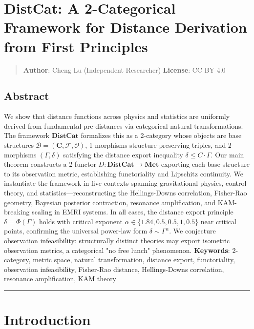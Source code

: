 \documentclass[
]{article}
\author{}
\date{}
\begin{document}
\section{DistCat: A 2-Categorical Framework for Distance Derivation from
First
Principles}\label{distcat-a-2-categorical-framework-for-distance-derivation-from-first-principles}

\begin{quote}
\textbf{Author}: Cheng Lu (Independent Researcher)
\textbf{License}: CC BY 4.0
\end{quote}

\subsection{Abstract}\label{abstract}

We show that distance functions across physics and statistics are uniformly
derived from fundamental pre-distances via categorical natural
transformations. The framework \(\mathbf{DistCat}\) formalizes this as a
2-category whose objects are base structures
\(\mathcal{B}=(\mathbf{C},\mathcal{F},\mathcal{O})\), 1-morphisms
structure-preserving triples, and 2-morphisms
\((\Gamma, \delta)\) satisfying the distance export inequality
\(\delta \leq C \cdot \Gamma\). Our main theorem constructs a 2-functor
\(D: \mathbf{DistCat} \to \mathbf{Met}\) exporting each base structure to
its observation metric, establishing functoriality and Lipschitz continuity.
We instantiate the framework in five contexts spanning gravitational physics,
control theory, and statistics---reconstructing the Hellings-Downs
correlation, Fisher-Rao geometry, Bayesian posterior contraction, resonance
amplification, and KAM-breaking scaling in EMRI systems. In all cases, the
distance export principle \(\delta = \Phi(\Gamma)\) holds with critical
exponent \(\alpha \in \{1.84, 0.5, 0.5, 1, 0.5\}\) near critical points,
confirming the universal power-law form \(\delta \sim \Gamma^\alpha\).
We conjecture observation infeasibility: structurally distinct theories may
export isometric observation metrics, a categorical "no free lunch"
phenomenon.
\textbf{Keywords}: 2-category, metric space, natural transformation, distance export, functoriality, observation infeasibility, Fisher-Rao distance, Hellings-Downs correlation, resonance amplification, KAM theory

\begin{center}\rule{0.5\linewidth}{0.5pt}\end{center}

\section{Introduction}\label{introduction}
\end{document}
